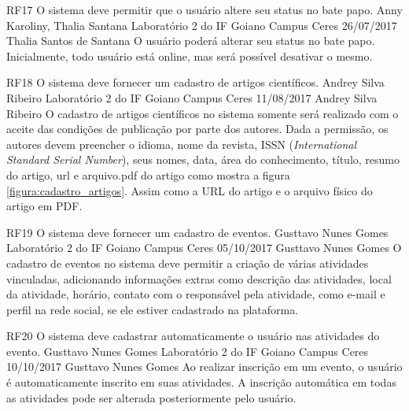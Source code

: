  \requisitoFuncional
 {RF17}
 {O sistema deve permitir que o usuário altere seu status no bate papo.}
 {Anny Karoliny, Thalia Santana}
 {Laboratório 2 do IF Goiano Campus Ceres}
 {26/07/2017}
 {Thalia Santos de Santana}
 { O usuário poderá alterar seu status no bate papo. Inicialmente, todo usuário está online, mas será possível desativar o mesmo.
 }	
 


\requisitoFuncional
 {RF18}
 {O sistema deve fornecer um cadastro de artigos científicos.}
 {Andrey Silva Ribeiro}
 {Laboratório 2 do IF Goiano Campus Ceres}
 {11/08/2017}
 {Andrey Silva Ribeiro}
 { O cadastro de artigos científicos no sistema somente será realizado com o aceite das condições de publicação por parte dos autores. Dada a permissão, os autores devem preencher o idioma, nome da revista, ISSN (\textit{International Standard Serial Number}), seus nomes, data, área do conhecimento, título, resumo do artigo, url e arquivo.pdf do artigo como mostra a figura \ref{figura:cadastro_artigos}. Assim como a URL do artigo e o arquivo físico do artigo em PDF.
 }
 
 \requisitoFuncional
 {RF19}
 {O sistema deve fornecer um cadastro de eventos.}
 {Gusttavo Nunes Gomes}
 {Laboratório 2 do IF Goiano Campus Ceres}
 {05/10/2017}
 {Gusttavo Nunes Gomes}
 { O cadastro de eventos no sistema deve permitir a criação de várias atividades vinculadas, adicionando informações extras como descrição das atividades, local da atividade, horário, contato com o responsável pela atividade, como e-mail e perfil na rede social, se ele estiver cadastrado na plataforma. 
 }
 
  \requisitoFuncional
 {RF20}
 {O sistema deve cadastrar automaticamente o usuário nas atividades do evento.}
 {Gusttavo Nunes Gomes}
 {Laboratório 2 do IF Goiano Campus Ceres}
 {10/10/2017}
 {Gusttavo Nunes Gomes}
 { Ao realizar inscrição em um evento, o usuário é automaticamente inscrito em suas atividades. A inscrição automática em todas as atividades pode ser alterada posteriormente pelo usuário.
 }
 
